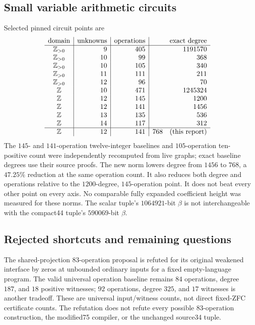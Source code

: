 \subsection{Small variable arithmetic circuits}
Selected pinned circuit points are
\[
\begin{array}{c|r|r|r}
\text{domain}&\text{unknowns}&\text{operations}&\text{exact degree}\\\hline
\mathbb Z_{>0}&9&405&1191570\\
\mathbb Z_{>0}&10&99&368\\
\mathbb Z_{>0}&10&105&340\\
\mathbb Z_{>0}&11&111&211\\
\mathbb Z_{>0}&12&96&70\\
\mathbb Z&10&471&1245324\\
\mathbb Z&12&145&1200\\
\mathbb Z&12&141&1456\\
\mathbb Z&13&135&536\\
\mathbb Z&14&117&312\\\hline
\mathbb Z&12&141&768\quad\text{(this report)}
\end{array}
\]
The $145$- and $141$-operation twelve-integer baselines and $105$-operation ten-positive count were independently recomputed from live graphs; exact baseline degrees use their source proofs. The new norm lowers degree from $1456$ to $768$, a $47.25\%$ reduction at the same operation count. It also reduces both degree and operations relative to the $1200$-degree, $145$-operation point. It does not beat every other point on every axis. No comparable fully expanded coefficient height was measured for these norms. The scalar tuple's $1064921$-bit $\beta$ is not interchangeable with the compact44 tuple's $590069$-bit $\beta$.

\subsection{Rejected shortcuts and remaining questions}
The shared-projection $83$-operation proposal is refuted for its original weakened interface by zeros at unbounded ordinary inputs for a fixed empty-language program. The valid universal operation baseline remains $84$ operations, degree $187$, and $18$ positive witnesses; $92$ operations, degree $325$, and $17$ witnesses is another tradeoff. These are universal input/witness counts, not direct fixed-ZFC certificate counts. The refutation does not refute every possible $83$-operation construction, the modified75 compiler, or the unchanged source34 tuple.


